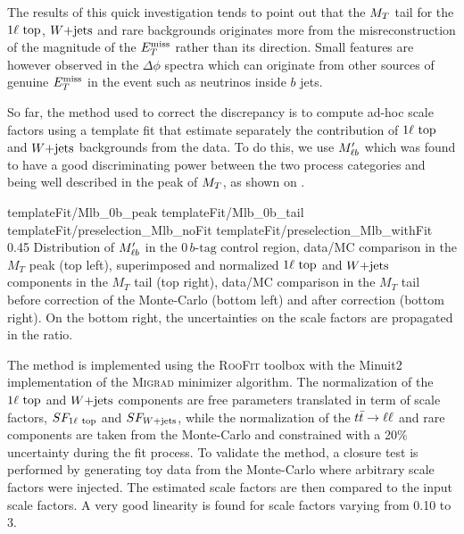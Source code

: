     The results of this quick investigation tends to point out that the $M_T$
    tail for the $1\ell~\text{top}$, $\text{$W$+jets}$ and rare backgrounds originates more
    from the misreconstruction of the magnitude of the $E_T^\text{miss}$ rather than its
    direction. Small features are however observed in the $\Delta \phi$ spectra
    which can originate from other sources of genuine $E_T^\text{miss}$ in the event such
    as neutrinos inside $b$ jets.

    So far, the method used to correct the discrepancy is to compute ad-hoc
    scale factors using a template fit that estimate separately the contribution
    of $1\ell~\text{top}$ and $\text{$W$+jets}$ backgrounds from the data. To do this, we
    use $M'_{\ell b}$ which was found to have a good discriminating power between
    the two process categories and being well described in the peak of $M_T$, as
    shown on .

                      {templateFit/Mlb_0b_peak}
                      {templateFit/Mlb_0b_tail}
                      {templateFit/preselection_Mlb_noFit}
                      {templateFit/preselection_Mlb_withFit}
                      {0.45}
                      {Distribution of $M'_{\ell b}$ in the $0\, b\text{-tag}$
                      control region, data/MC comparison in the $M_T$ peak (top
                      left), superimposed and normalized $1\ell~\text{top}$ and
                      $\text{$W$+jets}$ components in the $M_T$ tail (top right), data/MC
                      comparison in the $M_T$ tail before correction of the
                      Monte-Carlo (bottom left) and after correction (bottom
                      right).  On the bottom right, the uncertainties on the
                      scale factors are propagated in the ratio.}

    The method is implemented using the \textsc{RooFit} toolbox \cite{RooFit}
    with the Minuit2 implementation of the \textsc{Migrad} minimizer algorithm.
    The normalization of the $1\ell~\text{top}$ and $\text{$W$+jets}$ components are free
    parameters translated in term of scale factors, $SF_{1\ell~\text{top}}$ and
    $SF_{\text{$W$+jets}}$, while the normalization of the $t\bar{t} \rightarrow \ell \ell$ and rare
    components are taken from the Monte-Carlo and constrained with a 20\%
    uncertainty during the fit process. To validate the method, a closure test
    is performed by generating toy data from the Monte-Carlo where arbitrary
    scale factors were injected. The estimated scale factors are then compared
    to the input scale factors.  A very good linearity is found for scale
    factors varying from 0.10 to 3.

